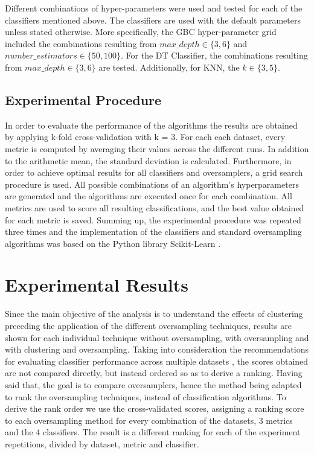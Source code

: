 \documentclass[parskip=full]{scrartcl}
\begin{document}
Different combinations of hyper-parameters were used and tested for each of the 
classifiers mentioned above. The classifiers are used with the default 
parameters unless stated otherwise. More specifically, the GBC hyper-parameter 
grid included the combinations resulting from $max\_depth \in \{3, 6\}$ and $number\_estimators \in \{50, 100\}$. For the DT Classifier, the combinations resulting from $max\_depth \in \{3, 6\}$ are tested. Additionally, for KNN, the $k \in \{3, 5\}$.

\subsection{Experimental Procedure}

In order to evaluate the performance of the algorithms the results are obtained 
by applying k-fold cross-validation with k = 3. For each each dataset, every 
metric is computed by averaging their values across the different runs. In 
addition to the arithmetic mean, the standard deviation is calculated. 
Furthermore, in order to achieve optimal results for all classifiers and 
oversamplers, a grid search procedure is used. All possible combinations of an 
algorithm’s hyperparameters are generated and the algorithms are executed once 
for each combination. All metrics are used to score all resulting 
classifications, and the best value obtained for each metric is saved. Summing 
up, the experimental procedure was repeated three times and the implementation 
of the classifiers and standard oversampling algorithms was based on the Python 
library Scikit-Learn \cite{Pedregosa2011}. 

\section{Experimental Results}

Since the main objective of the analysis is to understand the effects of 
clustering preceding the application of the different oversampling techniques, 
results are shown for each individual technique without oversampling, with 
oversampling and with clustering and oversampling. Taking into consideration 
the recommendations for evaluating classifier performance across multiple 
datasets \cite{Demsar2006}, the scores obtained are not compared directly, but 
instead ordered so as to derive a ranking. Having said that, the goal is to 
compare oversamplers, hence the method being adapted to rank the oversampling 
techniques, instead of classification algorithms. To derive the rank order we 
use the cross-validated scores, assigning a ranking score to each oversampling 
method for every combination of the datasets, 3 metrics and the 4 classifiers. 
The result is a different ranking for each of the experiment repetitions, 
divided by dataset, metric and classifier. 
\end{document}
